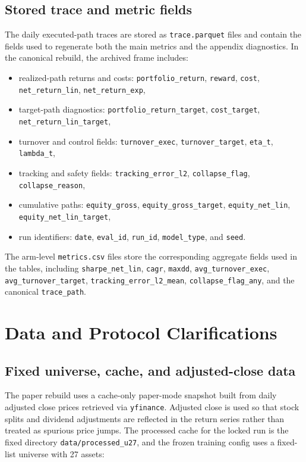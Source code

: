 \documentclass[10pt,twocolumn]{article}
\begin{document}
\subsection{Stored trace and metric fields}
The daily executed-path traces are stored as \texttt{trace.parquet} files and contain the fields used to regenerate both the main metrics and the appendix diagnostics. In the canonical rebuild, the archived frame includes:
\begin{itemize}[leftmargin=*,itemsep=1pt]
\item realized-path returns and costs: \texttt{portfolio\_return}, \texttt{reward}, \texttt{cost}, \texttt{net\_return\_lin}, \texttt{net\_return\_exp},
\item target-path diagnostics: \texttt{portfolio\_return\_target}, \texttt{cost\_target}, \texttt{net\_return\_lin\_target},
\item turnover and control fields: \texttt{turnover\_exec}, \texttt{turnover\_target}, \texttt{eta\_t}, \texttt{lambda\_t},
\item tracking and safety fields: \texttt{tracking\_error\_l2}, \texttt{collapse\_flag}, \texttt{collapse\_reason},
\item cumulative paths: \texttt{equity\_gross}, \texttt{equity\_gross\_target}, \texttt{equity\_net\_lin}, \texttt{equity\_net\_lin\_target},
\item run identifiers: \texttt{date}, \texttt{eval\_id}, \texttt{run\_id}, \texttt{model\_type}, and \texttt{seed}.
\end{itemize}
The arm-level \texttt{metrics.csv} files store the corresponding aggregate fields used in the tables, including \texttt{sharpe\_net\_lin}, \texttt{cagr}, \texttt{maxdd}, \texttt{avg\_turnover\_exec}, \texttt{avg\_turnover\_target}, \texttt{tracking\_error\_l2\_mean}, \texttt{collapse\_flag\_any}, and the canonical \texttt{trace\_path}.

\section{Data and Protocol Clarifications}
\label{app:data_protocol}
\subsection{Fixed universe, cache, and adjusted-close data}
The paper rebuild uses a cache-only paper-mode snapshot built from daily adjusted close prices retrieved via \texttt{yfinance}. Adjusted close is used so that stock splits and dividend adjustments are reflected in the return series rather than treated as spurious price jumps. The processed cache for the locked run is the fixed directory \texttt{data/processed\_u27}, and the frozen training config uses a fixed-list universe with 27 assets:
\end{document}
